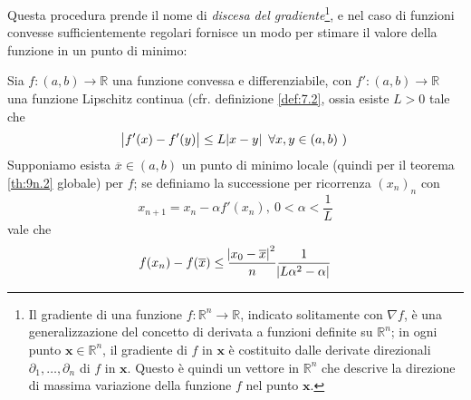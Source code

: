     Questa procedura prende il nome di \emph{discesa del gradiente}\footnote{Il gradiente di una funzione $f\colon \mathbb{R}^n\to\mathbb{R}$, indicato solitamente con $\nabla f$, è una generalizzazione del concetto di derivata a funzioni definite su $\mathbb{R}^n$; in ogni punto $\mathbf{x}\in\mathbb{R}^n$, il gradiente di $f$ in $\mathbf{x}$ è costituito dalle derivate direzionali $\partial_1, \dots, \partial_n$ di $f$ in $\mathbf{x}$. Questo è quindi un vettore in $\mathbb{R}^n$ che descrive la direzione di massima variazione della funzione $f$ nel punto $\mathbf{x}$.}, e nel caso di funzioni convesse sufficientemente regolari fornisce un modo per stimare il valore della funzione in un punto di minimo: 
    \begin{theorem}
        \label{th:9n.4}
        Sia $f\colon(a,b)\to\mathbb{R}$ una funzione convessa e differenziabile, con $f'\colon(a,b)\to\mathbb{R}$ una funzione Lipschitz continua (cfr. definizione \ref{def:7.2}, ossia esiste $L>0$ tale che
        \[
        \abs{f'(x)-f'(y)}\le L\abs{x-y} \ \forall x,y\in(a,b) \ \text{)}
        \]
        Supponiamo esista $\overline{x}\in(a,b)$ un punto di minimo locale (quindi per il teorema \ref{th:9n.2} globale) per $f$; se definiamo la successione per ricorrenza $(x_n)_n$ con 
        \[
        x_{n+1}= x_n - \alpha f'(x_n), \ 0<\alpha<\frac{1}{L}
        \]
        vale che 
        \[
        f(x_n)-f(\overline{x}) \le \frac{\abs{x_0 - \overline{x}}^2}{n}\frac{1}{\abs{L \alpha^2-\alpha}}
        \]
    \end{theorem}
